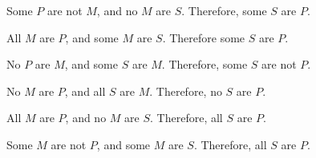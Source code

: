 \begin{exercises}

\item Some $P$ are not $M$, and no $M$ are $S$. Therefore, some $S$ are $P$.

\item All $M$ are $P$, and some $M$ are $S$. Therefore some $S$ are $P$. 

\item No $P$ are $M$, and some $S$ are $M$. Therefore, some $S$ are not $P$.
      
\item No $M$ are $P$, and all $S$ are $M$. Therefore, no $S$ are $P$.
\item All $M$ are $P$, and no $M$ are $S$. Therefore, all $S$ are $P$.
\item Some $M$ are not $P$, and some $M$ are $S$. Therefore, all $S$ are $P$.
\answer{\\
\begin{venns}
\drawsubsyl
\drawmidsyl
\drawpredsyl
\someexisttwofive
\someexistfiveseven
\end{venns}
\\

}
\end{exercises}
